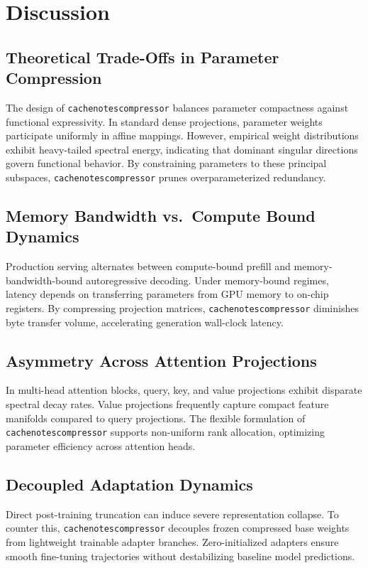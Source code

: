\section{Discussion}

\subsection{Theoretical Trade-Offs in Parameter Compression}
The design of \texttt{cachenotescompressor} balances parameter compactness against functional expressivity. In standard dense projections, parameter weights participate uniformly in affine mappings. However, empirical weight distributions exhibit heavy-tailed spectral energy, indicating that dominant singular directions govern functional behavior. By constraining parameters to these principal subspaces, \texttt{cachenotescompressor} prunes overparameterized redundancy.

\subsection{Memory Bandwidth vs.\ Compute Bound Dynamics}
Production serving alternates between compute-bound prefill and memory-bandwidth-bound autoregressive decoding. Under memory-bound regimes, latency depends on transferring parameters from GPU memory to on-chip registers. By compressing projection matrices, \texttt{cachenotescompressor} diminishes byte transfer volume, accelerating generation wall-clock latency.

\subsection{Asymmetry Across Attention Projections}
In multi-head attention blocks, query, key, and value projections exhibit disparate spectral decay rates. Value projections frequently capture compact feature manifolds compared to query projections. The flexible formulation of \texttt{cachenotescompressor} supports non-uniform rank allocation, optimizing parameter efficiency across attention heads.

\subsection{Decoupled Adaptation Dynamics}
Direct post-training truncation can induce severe representation collapse. To counter this, \texttt{cachenotescompressor} decouples frozen compressed base weights from lightweight trainable adapter branches. Zero-initialized adapters ensure smooth fine-tuning trajectories without destabilizing baseline model predictions.

